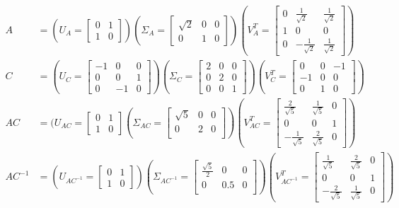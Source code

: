 \begin{align}
A &= (U_A = \begin{bmatrix}
0& 1  \\
1 & 0
\end{bmatrix})(
\Sigma_A = \begin{bmatrix}
\sqrt{2}  &  0  & 0\\
0 & 1 & 0
\end{bmatrix})(
V^T_A = \begin{bmatrix}
0& \frac{1}{\sqrt{2}}& \frac{1}{\sqrt{2}}  \\
1 & 0 & 0 \\
0& -\frac{1}{\sqrt{2}}& \frac{1}{\sqrt{2}}
\end{bmatrix}) \\
C &=
(U_C = \begin{bmatrix}
-1 & 0 & 0  \\
0 & 0 & 1 \\
0 & -1 & 0
\end{bmatrix})
(\Sigma_C = \begin{bmatrix}
2& 0 & 0  \\
0 & 2 & 0 \\
0 & 0 & 1
\end{bmatrix})
(V^T_C = \begin{bmatrix}
0 & 0 & -1  \\
-1 & 0 & 0 \\
0 & 1 & 0
\end{bmatrix}) \\
AC &=
(U_{AC} = \begin{bmatrix}
0 & 1 \\
1 & 0
\end{bmatrix}
(\Sigma_{AC} = \begin{bmatrix}
\sqrt{5}  &   0 & 0\\
0 & 2 & 0  \\
\end{bmatrix})
(V^T_{AC} = \begin{bmatrix}
\frac{2}{\sqrt{5}}&\frac{1}{\sqrt{5}} & 0 \\
0& 0 & 1 \\
-\frac{1}{\sqrt{5}} & \frac{2}{\sqrt{5}} & 0
\end{bmatrix}) \\
AC^{-1} &=
(U_{AC^{-1}} = \begin{bmatrix}
0 & 1 \\
1 & 0
\end{bmatrix})
(\Sigma_{AC^{-1}} = \begin{bmatrix}
\frac{\sqrt{5}}{2}  &   0 & 0\\
0 & 0.5 & 0  \\
\end{bmatrix})
(V^T_{AC^{-1}} = \begin{bmatrix}
\frac{1}{\sqrt{5}}&\frac{2}{\sqrt{5}} & 0 \\
0 & 0 & 1 \\
-\frac{2}{\sqrt{5}} & \frac{1}{\sqrt{5}} & 0
\end{bmatrix})
\end{align}

